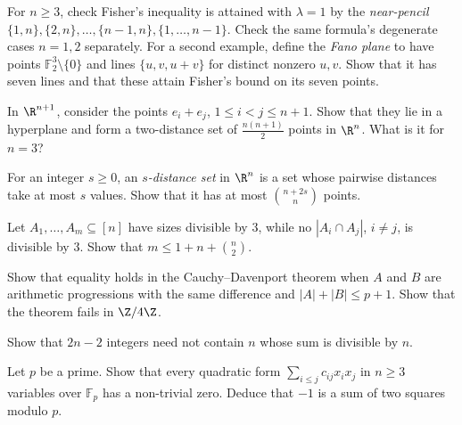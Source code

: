\begin{exercise}[$\star$]\label{combinatorial:ex:nearpencil}
For $n\ge3$, check Fisher's inequality is attained with $\lambda=1$ by the
\emph{near-pencil} $\{1,n\},\{2,n\},\dots,\{n-1,n\},\{1,\dots,n-1\}$.
Check the same formula's degenerate cases $n=1,2$ separately.
For a second example, define the \emph{Fano plane} to have points
$\mathbb F_2^3\setminus\{0\}$ and lines $\{u,v,u+v\}$ for distinct nonzero
$u,v$. Show that it has seven lines and that these attain Fisher's bound
on its seven points.
\end{exercise}

\begin{exercise}[$\star$]\label{combinatorial:ex:simplexdist}
In $\R^{n+1}$, consider the points $e_i+e_j$, $1\le i<j\le n+1$. Show that they lie in a hyperplane and form a two-distance set of $\frac{n(n+1)}2$ points in $\R^n$. What is it for $n=3$?
\end{exercise}

\begin{exercise}[$\star\star$]\label{combinatorial:ex:sdistance}
For an integer $s\ge0$, an \emph{$s$-distance set} in $\R^n$ is a set whose pairwise distances take at most $s$ values. Show that it has at most $\binom{n+2s}{n}$ points.
\end{exercise}

\begin{exercise}[$\star$]\label{combinatorial:ex:fwmodthree}
Let $A_1,\dots,A_m\subseteq[n]$ have sizes divisible by $3$, while no $|A_i\cap A_j|$, $i\ne j$, is divisible by $3$. Show that $m\le1+n+\binom n2$.
\end{exercise}

\begin{exercise}[$\star$]\label{combinatorial:ex:cdsharp}
Show that equality holds in the Cauchy--Davenport theorem when $A$ and $B$ are arithmetic progressions with the same difference and $|A|+|B|\le p+1$. Show that the theorem fails in $\Z/4\Z$.
\end{exercise}

\begin{exercise}[$\star$]\label{combinatorial:ex:egzsharp}
Show that $2n-2$ integers need not contain $n$ whose sum is divisible by $n$.
\end{exercise}

\begin{exercise}[$\star\star$]\label{combinatorial:ex:quadric}
Let $p$ be a prime. Show that every quadratic form $\sum_{i\le j}c_{ij}x_ix_j$ in $n\ge3$ variables over $\mathbb F_p$ has a non-trivial zero. Deduce that $-1$ is a sum of two squares modulo $p$.
\end{exercise}

